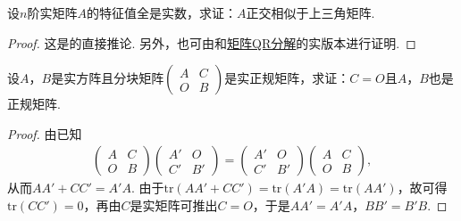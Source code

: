 \documentclass[../../main.tex]{subfiles}
\begin{document}
\begin{proposition}\label{proposition:两个半正定阵可同时合同对角化8}
设\(n\)阶实矩阵\(A\)的特征值全是实数，求证：\(A\)正交相似于上三角矩阵.
\end{proposition}
\begin{proof}
这是的直接推论. 另外，也可由和\hyperref[theorem:施密特正交化对应的矩阵分解,QR分解]{矩阵QR分解}的实版本进行证明.

\end{proof}

\begin{proposition}\label{proposition:两个半正定阵可同时合同对角化9}
设\(A\)，\(B\)是实方阵且分块矩阵\(\begin{pmatrix}A&C\\O&B\end{pmatrix}\)是实正规矩阵，求证：\(C = O\)且\(A\)，\(B\)也是正规矩阵.
\end{proposition}
\begin{proof}
由已知
\begin{align*}
\begin{pmatrix}A&C\\O&B\end{pmatrix}\begin{pmatrix}A'&O\\C'&B'\end{pmatrix}=\begin{pmatrix}A'&O\\C'&B'\end{pmatrix}\begin{pmatrix}A&C\\O&B\end{pmatrix},
\end{align*}
从而\(AA'+CC' = A'A\). 由于\(\mathrm{tr}(AA'+CC')=\mathrm{tr}(A'A)=\mathrm{tr}(AA')\)，故可得\(\mathrm{tr}(CC') = 0\)，再由\(C\)是实矩阵可推出\(C = O\)，于是\(AA' = A'A\)，\(BB' = B'B\).

\end{proof}
\end{document}
